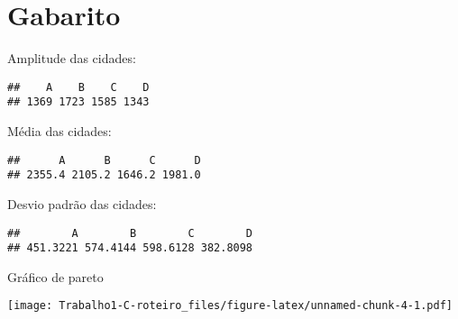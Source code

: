 \documentclass[]{article}
\begin{document}
\section{Gabarito}\label{gabarito}

Amplitude das cidades:

\begin{verbatim}
##    A    B    C    D 
## 1369 1723 1585 1343
\end{verbatim}

Média das cidades:

\begin{verbatim}
##      A      B      C      D 
## 2355.4 2105.2 1646.2 1981.0
\end{verbatim}

Desvio padrão das cidades:

\begin{verbatim}
##        A        B        C        D 
## 451.3221 574.4144 598.6128 382.8098
\end{verbatim}

Gráfico de pareto

\texttt{[image: Trabalho1-C-roteiro\_files/figure-latex/unnamed-chunk-4-1.pdf]}\\
\end{document}

